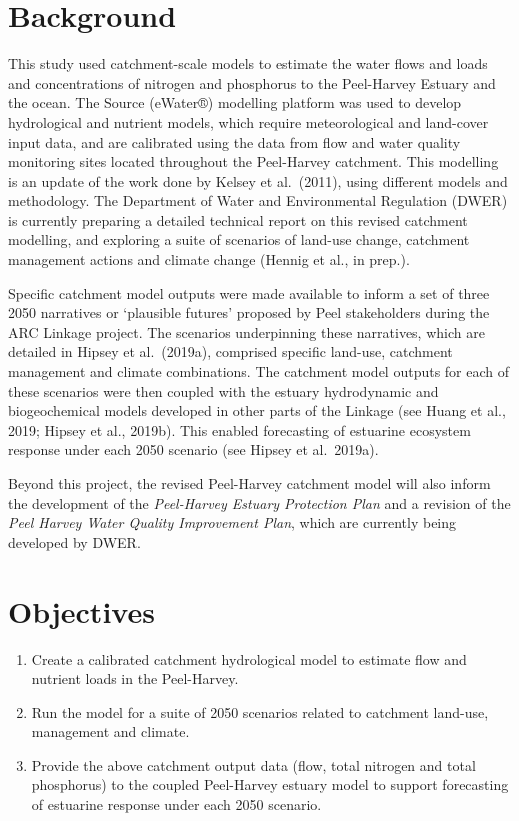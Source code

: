 \documentclass[
]{book}
\begin{document}
\hypertarget{background-6}{%
\section{Background}\label{background-6}}

This study used catchment-scale models to estimate the water flows and loads and concentrations of nitrogen and phosphorus to the Peel-Harvey Estuary and the ocean. The Source (eWater®) modelling platform was used to develop hydrological and nutrient models, which require meteorological and land-cover input data, and are calibrated using the data from flow and water quality monitoring sites located throughout the Peel-Harvey catchment. This modelling is an update of the work done by Kelsey et al.~(2011), using different models and methodology. The Department of Water and Environmental Regulation (DWER) is currently preparing a detailed technical report on this revised catchment modelling, and exploring a suite of scenarios of land-use change, catchment management actions and climate change (Hennig et al., in prep.).

Specific catchment model outputs were made available to inform a set of three 2050 narratives or `plausible futures' proposed by Peel stakeholders during the ARC Linkage project. The scenarios underpinning these narratives, which are detailed in Hipsey et al.~(2019a), comprised specific land-use, catchment management and climate combinations. The catchment model outputs for each of these scenarios were then coupled with the estuary hydrodynamic and biogeochemical models developed in other parts of the Linkage (see Huang et al., 2019; Hipsey et al., 2019b). This enabled forecasting of estuarine ecosystem response under each 2050 scenario (see Hipsey et al.~2019a).

Beyond this project, the revised Peel-Harvey catchment model will also inform the development of the \emph{Peel-Harvey Estuary Protection Plan} and a revision of the \emph{Peel Harvey Water Quality Improvement Plan}, which are currently being developed by DWER.~

\hypertarget{objectives-6}{%
\section{Objectives}\label{objectives-6}}

\begin{enumerate}
\def\labelenumi{\arabic{enumi}.}
\item
  Create a calibrated catchment hydrological model to estimate flow and nutrient loads in the Peel-Harvey.
\item
  Run the model for a suite of 2050 scenarios related to catchment land-use, management and climate.~
\item
  Provide the above catchment output data (flow, total nitrogen and total phosphorus) to the coupled Peel-Harvey estuary model to support forecasting of estuarine response under each 2050 scenario.~
\end{enumerate}
\end{document}
